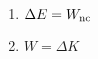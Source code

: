 

\vspace*{\fill}
\centering

\begin{enumerate}
    \item $\Delta E = W_{\rm nc}$ 
    \item $W = \Delta K$
\end{enumerate}

\centering
\vspace*{\fill}

